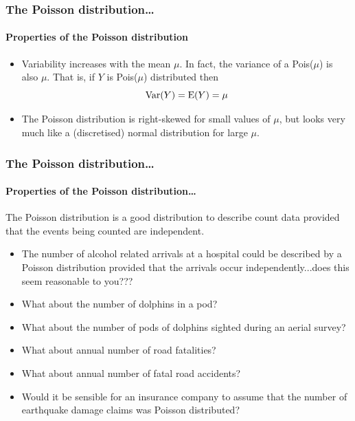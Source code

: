 \documentclass{beamer}\usepackage[]{graphicx}\usepackage[]{xcolor}
\begin{document}
\begin{frame}
\frametitle{The Poisson distribution\ldots}
\framesubtitle{Properties of the Poisson distribution}
\begin{itemize}
\item Variability increases with the mean $\mu$.
In fact, the variance of a Pois($\mu$) is also $\mu$.
That is, if $Y$ is Pois($\mu$) distributed then
\[\operatorname*{Var}(Y) = \operatorname{E}(Y) = \mu\]

\vspace{-1.5em}

\item The Poisson distribution is right-skewed for small values of $\mu$,
but looks very much like a (discretised) normal distribution for large $\mu$.
\end{itemize}
\end{frame}

\begin{frame}
\frametitle{The Poisson distribution\ldots}
\framesubtitle{Properties of the Poisson distribution\ldots}
The Poisson distribution is a good distribution to describe count data provided
that the events being counted are independent.
\begin{itemize}
\item The number of alcohol related arrivals at a hospital could be described by a Poisson distribution provided that the arrivals occur independently...does this seem reasonable to you???

\item What about the number of dolphins in a pod?

\item What about the number of pods of dolphins sighted during an aerial survey?

\item What about annual number of road fatalities?

\item What about annual number of fatal road accidents?
\end{itemize}

\bigskip


\begin{itemize}
\item Would it be sensible for an insurance company to assume that the number of earthquake damage claims was Poisson distributed?
\end{itemize}

\end{frame}
\end{document}
